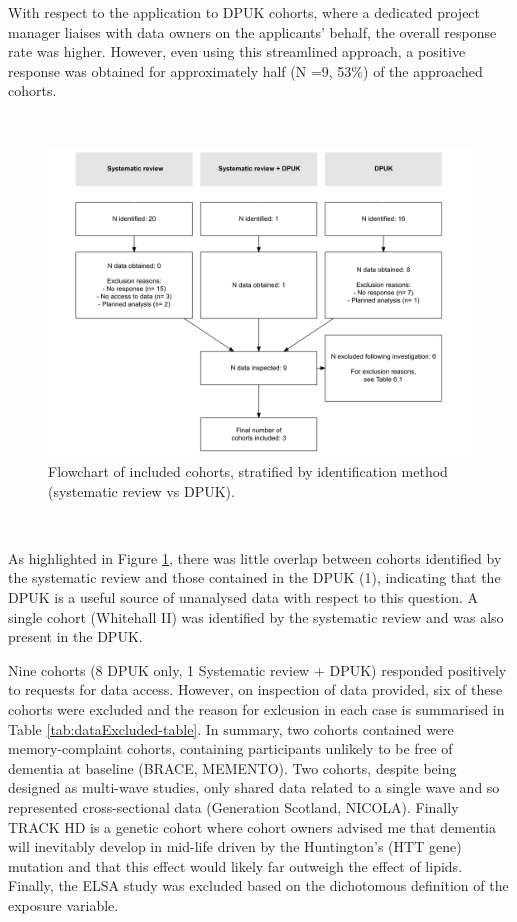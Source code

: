 \documentclass[a4paper, twoside]{templates/ociamthesis}
\begin{document}
With respect to the application to DPUK cohorts, where a dedicated project manager liaises with data owners on the applicants' behalf, the overall response rate was higher. However, even using this streamlined approach, a positive response was obtained for approximately half (N =9, 53\%) of the approached cohorts.

~





\begin{figure}[H]
\includegraphics[width=1\linewidth]{figures/ipd/cohortFlowchart} \caption[Flowchart]{Flowchart of included cohorts, stratified by identification method (systematic review vs DPUK).}\label{fig:cohortFlowchart}
\end{figure}

~

As highlighted in Figure \ref{fig:cohortFlowchart}, there was little overlap between cohorts identified by the systematic review and those contained in the DPUK (1), indicating that the DPUK is a useful source of unanalysed data with respect to this question. A single cohort (Whitehall II) was identified by the systematic review and was also present in the DPUK.

Nine cohorts (8 DPUK only, 1 Systematic review + DPUK) responded positively to requests for data access. However, on inspection of data provided, six of these cohorts were excluded and the reason for exlcusion in each case is summarised in Table \ref{tab:dataExcluded-table}. In summary, two cohorts contained were memory-complaint cohorts, containing participants unlikely to be free of dementia at baseline (BRACE, MEMENTO). Two cohorts, despite being designed as multi-wave studies, only shared data related to a single wave and so represented cross-sectional data (Generation Scotland, NICOLA). Finally TRACK HD is a genetic cohort where cohort owners advised me that dementia will inevitably develop in mid-life driven by the Huntington's (HTT gene) mutation and that this effect would likely far outweigh the effect of lipids. Finally, the ELSA study was excluded based on the dichotomous definition of the exposure variable.
\end{document}
